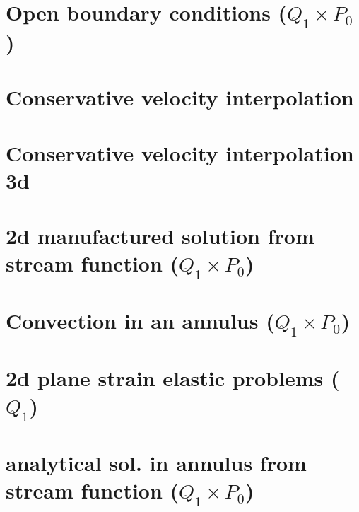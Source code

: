 \documentclass[a4paper,11pt]{report}
\begin{document}
\chapter{Open boundary conditions ($Q_1\times P_0$)\label{f29}} %

\chapter{Conservative velocity interpolation \label{f30}} %

\chapter{Conservative velocity interpolation 3d \label{f31}} %

\chapter{2d manufactured solution from stream function ($Q_1\times P_0$)\label{f32}} %

\chapter{Convection in an annulus  ($Q_1\times P_0$)  \label{f33}} %

\chapter{2d plane strain elastic problems ($Q_1$)\label{f34}} %

\chapter{analytical sol. in annulus from stream function ($Q_1\times P_0$) \label{f35}} %
\end{document}
